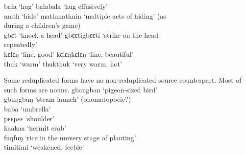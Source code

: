 bala \tab ‘hug' \tab balabala \tab ‘hug effusively'\\
math \tab ‘hide' \tab mathmathnin \tab ‘multiple acts of hiding' (as\\
\tab \tab \tab during a children's game)\\
gbɛt \tab ‘knock a head' \tab gbɛɛtigbɛɛti \tab ‘strike on the head\\ 
\tab \tab \tab repeatedly'\\
kɛlɛŋ \tab ‘fine, good' \tab kɛlɛŋkɛlɛŋ \tab ‘fine, beautiful'\\
thuk \tab ‘warm' \tab thukthuk \tab ‘very warm, hot'\\
\z

\noindent Some reduplicated forms have no non-reduplicated source counterpart. Most of such forms are nouns.
\TabPositions{2.5cm,4.5cm,7cm,8cm}
\ea%
    \label{ex:194}
    gbangban \tab ‘pigeon-sized bird'\\
    gbuŋgbuŋ \tab ‘steam launch' (onomatopoeic?)\\
    baba \tab ‘umbrella'\\
    pɛɛpɛɛ \tab ‘shoulder'\\
    kaakaa \tab ‘hermit crab'\\
    fuŋfuŋ \tab ‘rice in the nursery stage of planting'\\
    timitimi \tab ‘weakened, feeble'
\z

